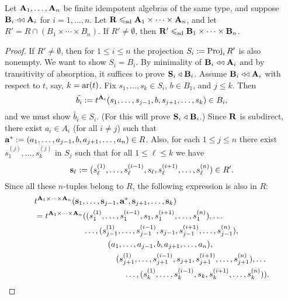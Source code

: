   Let $\mathbf{A}_1, \dots, \mathbf{A}_n$ be finite idempotent algebras of the same type, and
  suppose $\mathbf{B}_i \mathrel{\triangleleft\triangleleft} \mathbf{A}_i$ for $i=1,\dots, n$.
  Let $\mathbf{R} \leqslant_{\mathrm{sd}} \mathbf{A}_1 \times \cdots \times \mathbf{A}_n$, 
  and let $R' = R \cap (B_1 \times \cdots \times B_n)$.  
  If $R'\neq \emptyset$, then $\mathbf{R}' \leqslant_{\mathrm{sd}} \mathbf{B}_1 \times \cdots \times \mathbf{B}_n$.

\begin{proof}
  If $R'\neq \emptyset$, then for $1\leq i\leq n$ the projection 
  $S_i := \operatorname{Proj}_i R'$ is also nonempty.  
  We want to show $S_i = B_i$.
  By minimality of $\mathbf{B}_i \mathrel{\triangleleft\triangleleft} \mathbf{A}_i$ and by transitivity of
  absorption, it suffices to prove $\mathbf{S}_i \mathrel{\triangleleft} \mathbf{B}_i$.
  Assume $\mathbf{B}_i \mathrel{\triangleleft\triangleleft} \mathbf{A}_i$ with respect to $t$, say, $k = \operatorname{ar}(t)$.
  Fix $s_1, \dots, s_k \in S_i$, $b \in B_1$, and $j\leq k$.  Then 
  \[
  \tilde{b_i} := t^{\mathbf{A}_i}(s_1, \dots, s_{j-1}, b, s_{j+1}, \dots, s_k) \in B_i,
  \]
  and we must show $\tilde{b_i} \in S_i$. (For this will prove 
  $\mathbf{S}_i \mathrel{\triangleleft} \mathbf{B}_i$.)  Since $\mathbf{R}$ is subdirect, there exist
  $a_i \in A_i$ (for all $i\neq j$) such that 
  $\mathbf{a}^\ast:= (a_1, \dots, a_{j-1}, b, a_{j+1}, \dots, a_n)\in R$. 
  Also, for each $1\leq j\leq n$ there exist $s_1^{(j)}, \dots, s_k^{(j)}$ 
  in $S_j$ such that
  for all $1\leq \ell \leq k$ we have 
  \[
  \mathbf{s}_\ell := (s_\ell^{(1)},\dots, s_\ell^{(i-1)}, s_\ell, s_\ell^{(i+1)}, \dots, s_\ell^{(n)})\in R'.
  \] 
  Since all these $n$-tuples belong to $R$, the following expression is
  also in $R$: 
  \begin{align*}
    &t^{\mathbf{A}_1\times \cdots \times \mathbf{A}_n}(\mathbf{s}_1, \dots, \mathbf{s}_{j-1},\mathbf{a}^\ast, \mathbf{s}_{j+1}, \dots, \mathbf{s}_{k})\\
    &=t^{\mathbf{A}_1\times \cdots \times \mathbf{A}_n}((s_1^{(1)},\dots, s_1^{(i-1)}, s_1, s_1^{(i+1)}, \dots, s_1^{(n)}), \dots\\
    &\qquad \qquad \qquad  \dots, (s_{j-1}^{(1)},\dots, s_{j-1}^{(i-1)}, s_{j-1}, s_{j-1}^{(i+1)}, \dots, s_{j-1}^{(n)}),\\ 
    &\qquad \qquad \qquad\qquad \quad (a_1, \dots, a_{j-1}, b, a_{j+1}, \dots, a_n), \\
    & \qquad \qquad \qquad \qquad \quad \quad (s_{j+1}^{(1)},\dots, s_{j+1}^{(i-1)}, s_{j+1}, s_{j+1}^{(i+1)}, \dots, s_{j
+1}^{(n)}), \dots\\
    &\qquad \qquad \qquad \qquad \quad \quad \quad \dots, (s_{k}^{(1)},\dots,
    s_{k}^{(i-1)}, s_{k}, s_{k}^{(i+1)}, \dots, s_{k}^{(n)})).
  \end{align*}

\end{proof}
